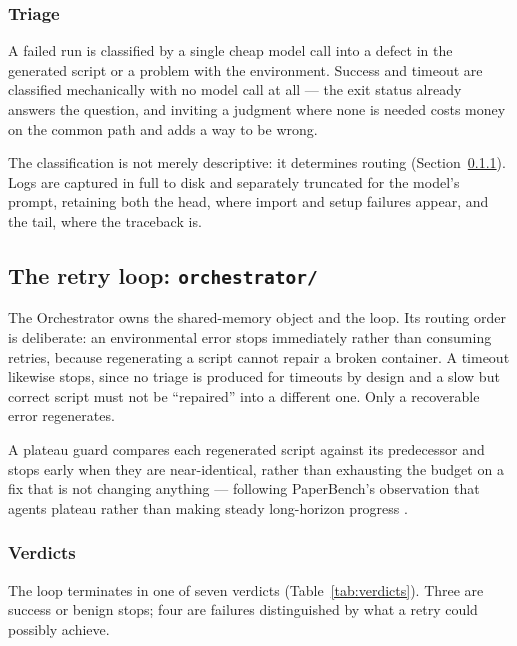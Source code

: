 \documentclass[11pt]{article}
\begin{document}
\subsubsection{Triage}

A failed run is classified by a single cheap model call into a defect in the generated
script or a problem with the environment. Success and timeout are classified mechanically
with no model call at all --- the exit status already answers the question, and inviting a
judgment where none is needed costs money on the common path and adds a way to be wrong.

The classification is not merely descriptive: it determines routing
(Section~\ref{sec:orchestrator}). Logs are captured in full to disk and separately
truncated for the model's prompt, retaining both the head, where import and setup failures
appear, and the tail, where the traceback is.

\subsection{The retry loop: \texttt{orchestrator/}}

The Orchestrator owns the shared-memory object and the loop. Its routing order is
deliberate: an environmental error stops immediately rather than consuming retries,
because regenerating a script cannot repair a broken container. A timeout likewise stops,
since no triage is produced for timeouts by design and a slow but correct script must not
be ``repaired'' into a different one. Only a recoverable error regenerates.

A plateau guard compares each regenerated script against its predecessor and stops early
when they are near-identical, rather than exhausting the budget on a fix that is not
changing anything --- following PaperBench's observation that agents plateau rather than
making steady long-horizon progress \cite{starace2025paperbench}.


\subsubsection{Verdicts}
\label{sec:orchestrator}

The loop terminates in one of seven verdicts (Table~\ref{tab:verdicts}). Three are
success or benign stops; four are failures distinguished by what a retry could possibly
achieve.
\end{document}
